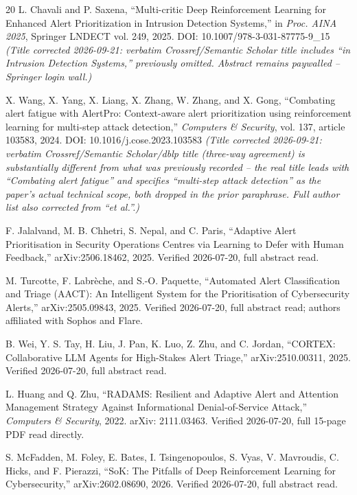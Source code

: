 \documentclass[conference]{IEEEtran}
\begin{document}
\begin{thebibliography}{20}
L. Chavali and P. Saxena, ``Multi-critic Deep Reinforcement Learning for Enhanced Alert Prioritization in Intrusion Detection Systems,'' in \emph{Proc. AINA 2025}, Springer LNDECT vol. 249, 2025. DOI: 10.1007/978-3-031-87775-9\_15 \emph{(Title corrected 2026-09-21: verbatim Crossref/Semantic Scholar title includes ``in Intrusion Detection Systems,'' previously omitted. Abstract remains paywalled -- Springer login wall.)}

X. Wang, X. Yang, X. Liang, X. Zhang, W. Zhang, and X. Gong, ``Combating alert fatigue with AlertPro: Context-aware alert prioritization using reinforcement learning for multi-step attack detection,'' \emph{Computers \& Security}, vol. 137, article 103583, 2024. DOI: 10.1016/j.cose.2023.103583 \emph{(Title corrected 2026-09-21: verbatim Crossref/Semantic Scholar/dblp title (three-way agreement) is substantially different from what was previously recorded -- the real title leads with ``Combating alert fatigue'' and specifies ``multi-step attack detection'' as the paper's actual technical scope, both dropped in the prior paraphrase. Full author list also corrected from ``et al.''.)}

F. Jalalvand, M. B. Chhetri, S. Nepal, and C. Paris, ``Adaptive Alert Prioritisation in Security Operations Centres via Learning to Defer with Human Feedback,'' arXiv:2506.18462, 2025. Verified 2026-07-20, full abstract read.

M. Turcotte, F. Labr\`eche, and S.-O. Paquette, ``Automated Alert Classification and Triage (AACT): An Intelligent System for the Prioritisation of Cybersecurity Alerts,'' arXiv:2505.09843, 2025. Verified 2026-07-20, full abstract read; authors affiliated with Sophos and Flare.

B. Wei, Y. S. Tay, H. Liu, J. Pan, K. Luo, Z. Zhu, and C. Jordan, ``CORTEX: Collaborative LLM Agents for High-Stakes Alert Triage,'' arXiv:2510.00311, 2025. Verified 2026-07-20, full abstract read.

L. Huang and Q. Zhu, ``RADAMS: Resilient and Adaptive Alert and Attention Management Strategy Against Informational Denial-of-Service Attack,'' \emph{Computers \& Security}, 2022. arXiv: 2111.03463. Verified 2026-07-20, full 15-page PDF read directly.

S. McFadden, M. Foley, E. Bates, I. Tsingenopoulos, S. Vyas, V. Mavroudis, C. Hicks, and F. Pierazzi, ``SoK: The Pitfalls of Deep Reinforcement Learning for Cybersecurity,'' arXiv:2602.08690, 2026. Verified 2026-07-20, full abstract read.


\end{thebibliography}
\end{document}
